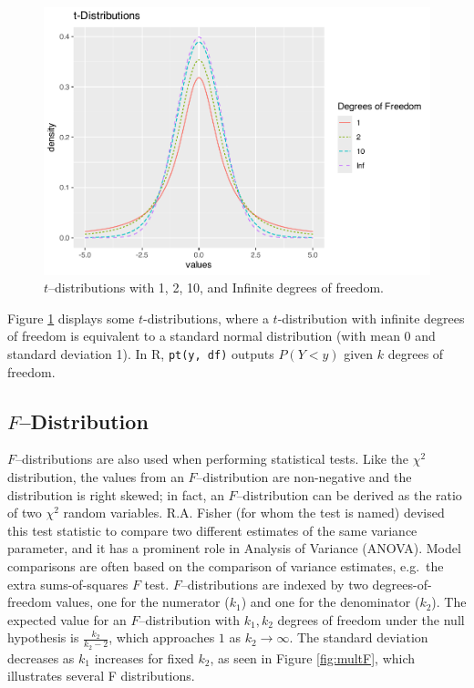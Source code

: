 \documentclass[
]{krantz}
\begin{document}
\begin{figure}

{\centering \includegraphics[width=0.6\linewidth]{bookdown-BeyondMLR_files/figure-latex/multT-1} 

}

\caption{\(t\)--distributions with 1, 2, 10, and Infinite degrees of freedom.}\label{fig:multT}
\end{figure}

Figure \ref{fig:multT} displays some \(t\)-distributions, where a \(t\)-distribution with infinite degrees of freedom is equivalent to a standard normal distribution (with mean 0 and standard deviation 1). In R, \texttt{pt(y,\ df)} outputs \(P(Y < y)\) given \(k\) degrees of freedom.

\hypertarget{fdistribution}{%
\subsection{\texorpdfstring{\(F\)--Distribution}{F--Distribution}}\label{fdistribution}}

\(F\)--distributions  are also used when performing statistical tests. Like the \(\chi^2\) distribution, the values from an \(F\)--distribution are non-negative and the distribution is right skewed; in fact, an \(F\)--distribution can be derived as the ratio of two \(\chi^2\) random variables. R.A. Fisher (for whom the test is named) devised this test statistic to compare two different estimates of the same variance parameter, and it has a prominent role in Analysis of Variance (ANOVA). Model comparisons are often based on the comparison of variance estimates, e.g.~the extra sums-of-squares \(F\) test. \(F\)--distributions are indexed by two degrees-of-freedom values, one for the numerator (\(k_1\)) and one for the denominator (\(k_2\)). The expected value for an \(F\)--distribution with \(k_1, k_2\) degrees of freedom under the null hypothesis is \(\frac{k_2}{k_2 - 2}\), which approaches \(1\) as \(k_2 \rightarrow \infty\). The standard deviation decreases as \(k_1\) increases for fixed \(k_2\), as seen in Figure \ref{fig:multF}, which illustrates several F distributions.
\end{document}
